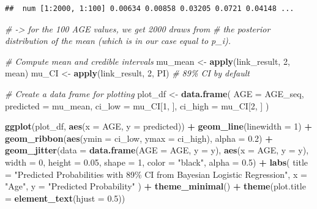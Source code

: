 \documentclass[
]{book}
\newenvironment{Shaded}{\begin{snugshade}}{\end{snugshade}}
\newcommand{\AttributeTok}[1]{\textcolor[rgb]{0.13,0.29,0.53}{#1}}
\newcommand{\CommentTok}[1]{\textcolor[rgb]{0.56,0.35,0.01}{\textit{#1}}}
\newcommand{\DecValTok}[1]{\textcolor[rgb]{0.00,0.00,0.81}{#1}}
\newcommand{\FloatTok}[1]{\textcolor[rgb]{0.00,0.00,0.81}{#1}}
\newcommand{\FunctionTok}[1]{\textcolor[rgb]{0.13,0.29,0.53}{\textbf{#1}}}
\newcommand{\NormalTok}[1]{#1}
\newcommand{\OtherTok}[1]{\textcolor[rgb]{0.56,0.35,0.01}{#1}}
\newcommand{\SpecialCharTok}[1]{\textcolor[rgb]{0.81,0.36,0.00}{\textbf{#1}}}
\newcommand{\StringTok}[1]{\textcolor[rgb]{0.31,0.60,0.02}{#1}}
\begin{document}
\begin{verbatim}
##  num [1:2000, 1:100] 0.00634 0.00858 0.03205 0.0721 0.04148 ...
\end{verbatim}

\begin{Shaded}
\begin{Highlighting}[]
\CommentTok{\# {-}\textgreater{} for the 100 AGE values, we get 2000 draws from}
\CommentTok{\# the posterior distribution of the mean (which is in our case equal to p\_i).}

\CommentTok{\# Compute mean and credible intervals}
\NormalTok{mu\_mean }\OtherTok{\textless{}{-}} \FunctionTok{apply}\NormalTok{(link\_result, }\DecValTok{2}\NormalTok{, mean)}
\NormalTok{mu\_CI }\OtherTok{\textless{}{-}} \FunctionTok{apply}\NormalTok{(link\_result, }\DecValTok{2}\NormalTok{, PI)  }\CommentTok{\# 89\% CI by default}

\CommentTok{\# Create a data frame for plotting}
\NormalTok{plot\_df }\OtherTok{\textless{}{-}} \FunctionTok{data.frame}\NormalTok{(}
  \AttributeTok{AGE =}\NormalTok{ AGE\_seq,}
  \AttributeTok{predicted =}\NormalTok{ mu\_mean,}
  \AttributeTok{ci\_low =}\NormalTok{ mu\_CI[}\DecValTok{1}\NormalTok{, ],}
  \AttributeTok{ci\_high =}\NormalTok{ mu\_CI[}\DecValTok{2}\NormalTok{, ]}
\NormalTok{)}

\FunctionTok{ggplot}\NormalTok{(plot\_df, }\FunctionTok{aes}\NormalTok{(}\AttributeTok{x =}\NormalTok{ AGE, }\AttributeTok{y =}\NormalTok{ predicted)) }\SpecialCharTok{+}
  \FunctionTok{geom\_line}\NormalTok{(}\AttributeTok{linewidth =} \DecValTok{1}\NormalTok{) }\SpecialCharTok{+}
  \FunctionTok{geom\_ribbon}\NormalTok{(}\FunctionTok{aes}\NormalTok{(}\AttributeTok{ymin =}\NormalTok{ ci\_low, }\AttributeTok{ymax =}\NormalTok{ ci\_high), }\AttributeTok{alpha =} \FloatTok{0.2}\NormalTok{) }\SpecialCharTok{+}
  \FunctionTok{geom\_jitter}\NormalTok{(}\AttributeTok{data =} \FunctionTok{data.frame}\NormalTok{(}\AttributeTok{AGE =}\NormalTok{ AGE, }\AttributeTok{y =}\NormalTok{ y),}
              \FunctionTok{aes}\NormalTok{(}\AttributeTok{x =}\NormalTok{ AGE, }\AttributeTok{y =}\NormalTok{ y),}
              \AttributeTok{width =} \DecValTok{0}\NormalTok{, }\AttributeTok{height =} \FloatTok{0.05}\NormalTok{,}
              \AttributeTok{shape =} \DecValTok{1}\NormalTok{, }\AttributeTok{color =} \StringTok{"black"}\NormalTok{, }\AttributeTok{alpha =} \FloatTok{0.5}\NormalTok{) }\SpecialCharTok{+}
  \FunctionTok{labs}\NormalTok{(}
    \AttributeTok{title =} \StringTok{"Predicted Probabilities with 89\% CI from Bayesian Logistic Regression"}\NormalTok{,}
    \AttributeTok{x =} \StringTok{"Age"}\NormalTok{,}
    \AttributeTok{y =} \StringTok{"Predicted Probability"}
\NormalTok{  ) }\SpecialCharTok{+}
  \FunctionTok{theme\_minimal}\NormalTok{() }\SpecialCharTok{+}
  \FunctionTok{theme}\NormalTok{(}\AttributeTok{plot.title =} \FunctionTok{element\_text}\NormalTok{(}\AttributeTok{hjust =} \FloatTok{0.5}\NormalTok{))}
\end{Highlighting}
\end{Shaded}
\end{document}
